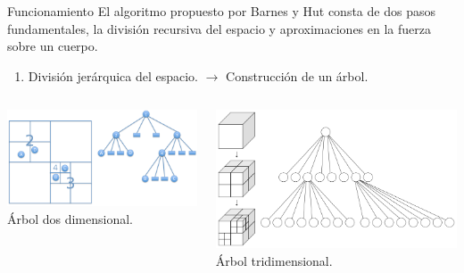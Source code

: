 \documentclass{beamer}
\newcounter{stepsBarnes}
\newcommand{\seti}{\setcounter{stepsBarnes}{\value{enumi}}}
\begin{document}
\begin{frame}{Funcionamiento}
	El algoritmo propuesto por Barnes y Hut consta de dos pasos fundamentales, la divisi\'on recursiva del espacio y aproximaciones en la fuerza sobre un cuerpo. \pause
	\begin{enumerate}
		\item Divisi\'on jer\'arquica del espacio. $\rightarrow$ Construcci\'on de un \'arbol.\pause
		\seti
	\end{enumerate}
	\begin{columns}
		\begin{column}{0.5\linewidth}
			\centering
			\includegraphics[width=\linewidth]{sources/images/quadtree.png}\\
			\'Arbol dos dimensional.\pause
		\end{column}
		\begin{column}{0.5\linewidth}
			\centering
			\includegraphics[width=\linewidth]{sources/images/octree.png}\\
			\'Arbol tridimensional.
		\end{column}
	\end{columns}
\end{frame}
\end{document}

